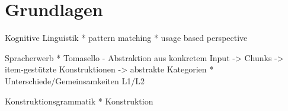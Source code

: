 \section{Grundlagen}

Kognitive Linguistik
* pattern matching
* usage based perspective

Spracherwerb
* Tomasello - Abstraktion aus konkretem Input -> Chunks -> item-gestützte Konstruktionen -> abstrakte Kategorien
* Unterschiede/Gemeinsamkeiten L1/L2

Konstruktionsgrammatik
* Konstruktion
